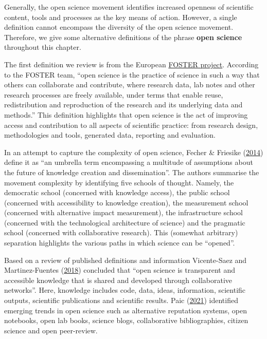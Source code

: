 \documentclass[
]{book}
\begin{document}
Generally, the open science movement identifies increased openness of scientific content, tools and processes as the key means of action. However, a single definition cannot encompass the diversity of the open science movement. Therefore, we give some alternative definitions of the phrase \textbf{open science} throughout this chapter.

The first definition we review is from the European \href{https://www.fosteropenscience.eu/}{FOSTER project}. According to the FOSTER team, ``open science is the practice of science in such a way that others can collaborate and contribute, where research data, lab notes and other research processes are freely available, under terms that enable reuse, redistribution and reproduction of the research and its underlying data and methods.'' This definition highlights that open science is the act of improving access and contribution to all aspects of scientific practice: from research design, methodologies and tools, generated data, reporting and evaluation.

In an attempt to capture the complexity of open science, Fecher \& Friesike (\href{https://www.researchgate.net/publication/236607487_Open_Science_One_Term_Five_Schools_of_Thought}{2014}) define it as ``an umbrella term encompassing a multitude of assumptions about the future of knowledge creation and dissemination''. The authors summarise the movement complexity by identifying five schools of thought. Namely, the democratic school (concerned with knowledge access), the public school (concerned with accessibility to knowledge creation), the measurement school (concerned with alternative impact measurement), the infrastructure school (concerned with the technological architecture of science) and the pragmatic school (concerned with collaborative research). This (somewhat arbitrary) separation highlights the various paths in which science can be ``opened''.

Based on a review of published definitions and information Vicente-Saez and Martinez-Fuentes (\href{https://isiarticles.com/bundles/Article/pre/pdf/143111.pdf}{2018}) concluded that ``open science is transparent and accessible knowledge that is shared and developed through collaborative networks''. Here, knowledge includes code, data, ideas, information, scientific outputs, scientific publications and scientific results. Paic (\href{https://goingdigital.oecd.org/data/notes/No13_ToolkitNote_OpenScience.pdf}{2021}) identified emerging trends in open science such as alternative reputation systems, open notebooks, open lab books, science blogs, collaborative bibliographies, citizen science and open peer-review.
\end{document}
